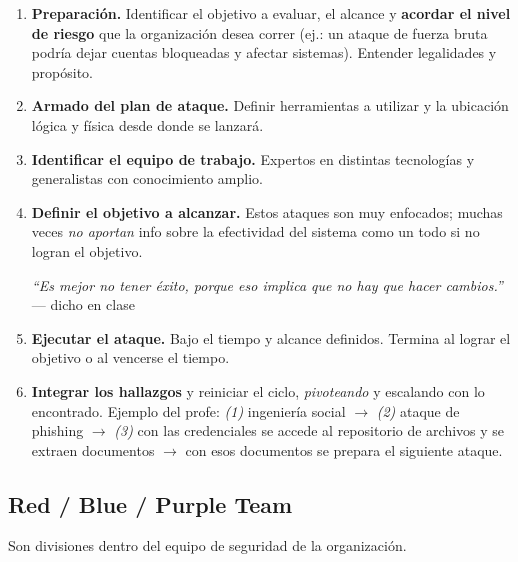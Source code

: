 \documentclass[11pt,a4paper]{article}
\newcommand{\prof}[1]{\par\medskip\noindent\textit{``#1''}\\[-2pt]\hspace*{1em}%
  {\footnotesize\textcolor{black!60}{--- dicho en clase}}\par\medskip\noindent}
\begin{document}
\begin{enumerate}[leftmargin=1.6em,itemsep=2pt]
  \item \textbf{Preparación.} Identificar el objetivo a evaluar, el alcance y \textbf{acordar el
        nivel de riesgo} que la organización desea correr (ej.: un ataque de fuerza bruta podría
        dejar cuentas bloqueadas y afectar sistemas). Entender legalidades y propósito.
  \item \textbf{Armado del plan de ataque.} Definir herramientas a utilizar y la ubicación
        lógica y física desde donde se lanzará.
  \item \textbf{Identificar el equipo de trabajo.} Expertos en distintas tecnologías y
        generalistas con conocimiento amplio.
  \item \textbf{Definir el objetivo a alcanzar.} Estos ataques son muy enfocados; muchas veces
        \emph{no aportan} info sobre la efectividad del sistema como un todo si no logran el
        objetivo. \prof{Es mejor no tener éxito, porque eso implica que no hay que hacer cambios.}
  \item \textbf{Ejecutar el ataque.} Bajo el tiempo y alcance definidos. Termina al lograr el
        objetivo o al vencerse el tiempo.
  \item \textbf{Integrar los hallazgos} y reiniciar el ciclo, \emph{pivoteando} y escalando con
        lo encontrado. Ejemplo del profe: \emph{(1)} ingeniería social $\to$ \emph{(2)} ataque
        de phishing $\to$ \emph{(3)} con las credenciales se accede al repositorio de archivos y
        se extraen documentos $\to$ con esos documentos se prepara el siguiente ataque.
\end{enumerate}

\subsection{Red / Blue / Purple Team}

Son divisiones dentro del equipo de seguridad de la organización.
\end{document}
